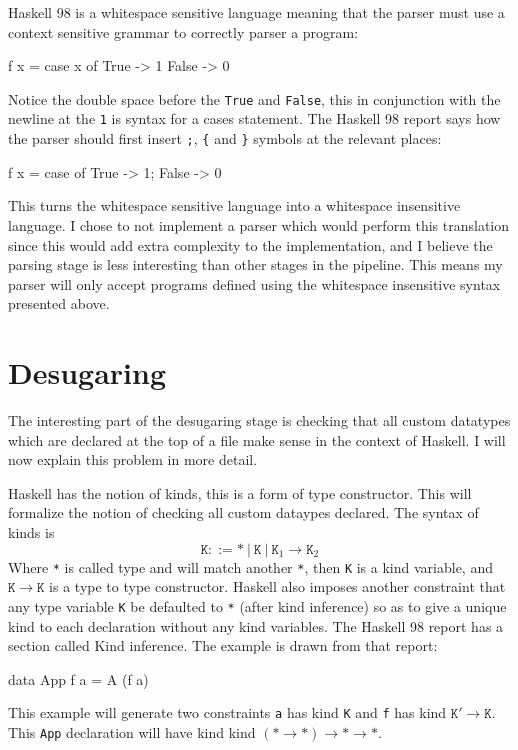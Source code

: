 \documentclass[float=false, crop=false]{standalone}
\begin{document}
Haskell 98 is a whitespace sensitive language meaning that the parser must use a
context sensitive grammar to correctly parser a program:
\begin{HaskellLst}
f x = case x of 
  True  -> 1
  False -> 0
\end{HaskellLst}
Notice the double space before the \texttt{True} and \texttt{False}, this in conjunction with the
newline at the \texttt{1} is syntax for a cases statement. The Haskell 98 report
says how the parser should first insert \texttt{;},  \texttt{\{} and \texttt{\}} symbols at the 
relevant places:
\begin{HaskellLst}
f x = case of {
  True  -> 1;
  False -> 0
}
\end{HaskellLst}
This turns the whitespace sensitive language into a whitespace insensitive language. I chose to 
not implement a parser which would perform this translation since this would add extra complexity to the
implementation, and I believe the parsing stage is less interesting than other stages in the pipeline.
This means my parser will only accept programs defined using the whitespace insensitive 
syntax presented above.


\section{Desugaring}

The interesting part of the desugaring stage is 
checking that all custom datatypes which are declared at the top of a
file make sense in the context of Haskell. I will now explain this
problem in more detail.

Haskell has the notion of kinds, this is a form of type constructor. This will
formalize the notion of checking all custom dataypes declared.
The syntax of kinds is
\[ \mathtt{K} ::= \mathtt{*}\ |\ \mathtt{K}\  |\ \mathtt{K}_1 \rightarrow \mathtt{K}_2 \] 
Where \texttt{*} is called type and will match another
\texttt{*}, then \texttt{K} is a kind variable, and $\mathtt{K} \rightarrow \mathtt{K}$ is a type to type constructor.
Haskell also imposes another constraint that any type variable \texttt{K} 
be defaulted to \texttt{*} (after kind inference) so as to give a
unique kind to each declaration without any kind variables.
The Haskell 98 report has a section \cite[4.6]{haskell98-spec} called Kind inference.
The example is drawn from that report:
\begin{HaskellLst}
data App f a = A (f a)
\end{HaskellLst}
This example will generate two constraints \texttt{a} has kind \texttt{K} and \texttt{f} 
has kind $\mathtt{K'} \rightarrow \mathtt{K}$. This \texttt{App} declaration will have kind  
kind $(\mathtt{*}\rightarrow\mathtt{*})\rightarrow\mathtt{*}\rightarrow
\mathtt{*}$.
\end{document}
